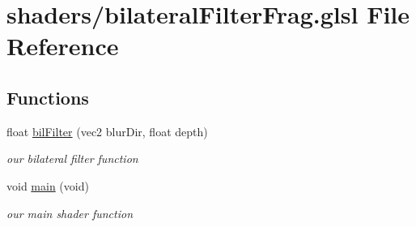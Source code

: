 \hypertarget{bilateral_filter_frag_8glsl}{\section{shaders/bilateral\-Filter\-Frag.glsl File Reference}
\label{bilateral_filter_frag_8glsl}
}
\subsection*{Functions}
\begin{DoxyCompactItemize}
\item 
float \hyperlink{bilateral_filter_frag_8glsl_a4a4466509a3efe0b0eb00be16e5da684}{bil\-Filter} (vec2 blur\-Dir, float depth)
\begin{DoxyCompactList}\small\item\em our bilateral filter function \end{DoxyCompactList}\item 
\hypertarget{bilateral_filter_frag_8glsl_a6288eba0f8e8ad3ab1544ad731eb7667}{void \hyperlink{bilateral_filter_frag_8glsl_a6288eba0f8e8ad3ab1544ad731eb7667}{main} (void)}\label{bilateral_filter_frag_8glsl_a6288eba0f8e8ad3ab1544ad731eb7667}

\begin{DoxyCompactList}\small\item\em our main shader function \end{DoxyCompactList}\end{DoxyCompactItemize}
